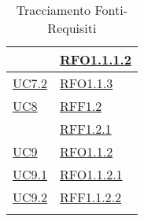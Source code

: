 \begin{longtable}{|>{\centering}m{5cm}|m{5cm}<{\centering}|}
& \hyperlink{RFO1.1.1.2}{RFO1.1.1.2}\\ \hline
\hyperref[UC7.2]{UC7.2} & \hyperlink{RFO1.1.3}{RFO1.1.3}\\ \hline
\hyperref[UC8]{UC8} & \hyperlink{RFF1.2}{RFF1.2}\\
& \hyperlink{RFF1.2.1}{RFF1.2.1}\\ \hline
\hyperref[UC9]{UC9} & \hyperlink{RFO1.1.2}{RFO1.1.2}\\ \hline
\hyperref[UC9.1]{UC9.1} & \hyperlink{RFO1.1.2.1}{RFO1.1.2.1}\\ \hline
\hyperref[UC9.2]{UC9.2} & \hyperlink{RFF1.1.2.2}{RFF1.1.2.2}\\ \hline
\caption[Tracciamento Fonti-Requisiti]{Tracciamento Fonti-Requisiti}
\label{tabella:fonti-requi}
\end{longtable}
\clearpage
